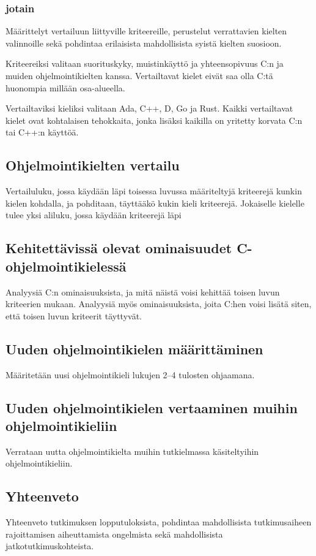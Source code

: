 \subsubsection{jotain}

Määrittelyt vertailuun liittyville kriteereille, perustelut verrattavien
kielten valinnoille sekä pohdintaa erilaisista mahdollisista syistä kielten
suosioon.

Kriteereiksi valitaan suorituskyky, muistinkäyttö ja yhteensopivuus C:n ja
muiden ohjelmointikielten kanssa. Vertailtavat kielet eivät saa olla C:tä
huonompia millään osa-alueella.

Vertailtaviksi kieliksi valitaan Ada, C++, D, Go ja Rust. Kaikki vertailtavat
kielet ovat kohtalaisen tehokkaita, jonka lisäksi kaikilla on yritetty korvata
C:n tai C++:n käyttöä.

\subsection{Ohjelmointikielten vertailu}

Vertailuluku, jossa käydään läpi toisessa luvussa määriteltyjä kriteerejä
kunkin kielen kohdalla, ja pohditaan, täyttääkö kukin kieli kriteerejä.
Jokaiselle kielelle tulee yksi aliluku, jossa käydään kriteerejä läpi

\subsection{Kehitettävissä olevat ominaisuudet C-ohjelmointikielessä}

Analyysiä C:n ominaisuuksista, ja mitä näistä voisi kehittää toisen luvun
kriteerien mukaan. Analyysiä myös ominaisuuksista, joita C:hen voisi lisätä
siten, että toisen luvun kriteerit täyttyvät.

\subsection{Uuden ohjelmointikielen määrittäminen}

Määritetään uusi ohjelmointikieli lukujen 2--4 tulosten ohjaamana.

\subsection{Uuden ohjelmointikielen vertaaminen muihin ohjelmointikieliin}

Verrataan uutta ohjelmointikielta muihin tutkielmassa käsiteltyihin
ohjelmointikieliin.

\subsection{Yhteenveto}

Yhteenveto tutkimuksen lopputuloksista, pohdintaa mahdollisista tutkimusaiheen
rajoittamisen aiheuttamista ongelmista sekä mahdollisista
jatkotutkimuskohteista.
